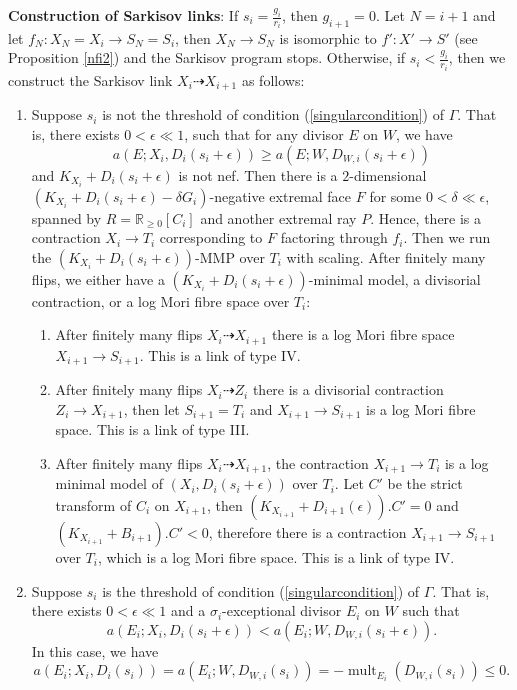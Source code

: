 \textbf{Construction of Sarkisov links}\label{Construction}: If $s_{i}=\frac{g_{i}}{r_{i}}$, then $g_{i+1}=0$. Let $N=i+1$  and let $f_{N}:X_{N}=X_{i} \to S_{N}=S_{i}$, then $X_{N}\to S_{N}$ is isomorphic to $f':X'\to S'$ (see Proposition \ref{nfi2}) and  the Sarkisov program stops. Otherwise, if  $s_{i}<\frac{g_{i}}{r_{i}}$, then we construct the Sarkisov link $X_{i}\dashrightarrow X_{i+1}$ as follows:
\begin{enumerate}
  \item\label{2a} Suppose $s_{i}$ is not the threshold of  condition (\ref{singularcondition}) of $\Gamma$. That is, there exists $0<\epsilon\ll 1$, such that for any divisor $E$ on $W$, we have
  \[
    a(E;X_{i},D_{i}(s_{i}+\epsilon))\geqslant a(E;W,D_{W,i}(s_{i}+\epsilon))
  \]
  and $K_{X_{i}}+D_{i}(s_{i}+\epsilon)$ is not nef. Then there is a $2$-dimensional $(K_{X_{i}}+D_{i}(s_{i}+\epsilon)-\delta G_{i})$-negative extremal face $F$ for some $0< \delta \ll \epsilon $, spanned by $R=\mathbb{R}_{\geqslant 0}[C_{i}]$ and another extremal ray $P$. Hence, there is a contraction $X_{i}\to T_{i}$ corresponding to $F$ factoring through $f_{i}$. Then we run the $(K_{X_{i}}+D_{i}(s_{i}+\epsilon))$-MMP over $T_{i}$ with scaling. After finitely many flips, we either have a $(K_{X_{i}}+D_{i}(s_{i}+\epsilon))$-minimal model, a divisorial contraction, or a log Mori fibre space over $T_{i}$:
  \begin{enumerate}
    \item\label{2a1}After finitely many flips $X_{i}\dashrightarrow X_{i+1}$ there is a log Mori fibre space $X_{i+1}\to S_{i+1}$. This is a link of type IV.
    \item\label{2a2} After finitely many flips $X_{i}\dashrightarrow Z_{i}$ there is a divisorial contraction $Z_{i}\to X_{i+1}$, then let $S_{i+1}=T_{i}$ and $X_{i+1}\to S_{i+1}$ is a log Mori fibre space. This is a link of type III.
    \item \label{2a3}After finitely many flips $X_{i}\dashrightarrow X_{i+1}$,  the contraction $X_{i+1}\to T_{i}$ is a log minimal model of $\left(X_{i},D_{i}\left(s_{i}+\epsilon\right)\right)$ over $T_{i}$. Let  $C'$ be the strict transform of  $C_{i}$ on $X_{i+1}$, then $(K_{X_{i+1}}+D_{i+1}(\epsilon)).C'=0$ and $(K_{X_{i+1}}+B_{i+1}).C'<0$, therefore there is a contraction  $X_{i+1} \to S_{i+1}$ over $T_i$, which is a log Mori fibre space. This is a link of type IV.
  \end{enumerate}
  \item\label{2b} Suppose $s_{i}$ is the threshold of condition (\ref{singularcondition}) of $\Gamma$. That is, there exists  $0<\epsilon \ll 1$ and a $\sigma_{i}$-exceptional divisor $E_{i}$ on $W$ such that
  \[
    a(E_{i};X_{i},D_{i}(s_{i}+\epsilon))< a(E_{i};W,D_{W,i}(s_{i}+\epsilon))
    .\]
  In this case, we have
  \[
    a(E_{i};X_{i},D_{i}(s_{i}))= a(E_{i};W,D_{W,i}(s_{i}))=-\operatorname{mult}_{E_{i}}(D_{W,i}(s_{i}))\leqslant 0
    .\]


\end{enumerate}
